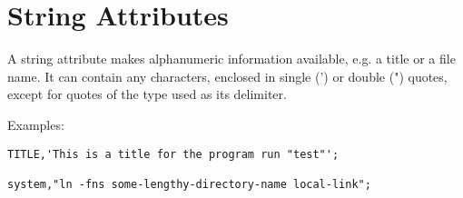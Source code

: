 
\section{String Attributes}
\label{sec:string}

A string attribute makes alphanumeric information available, e.g. a
title or a file name. It can contain any characters, enclosed in single
(') or double (") quotes, except for quotes of the type used as its
delimiter.  

Examples: 
\begin{verbatim}
TITLE,'This is a title for the program run "test"';

system,"ln -fns some-lengthy-directory-name local-link";
\end{verbatim}

